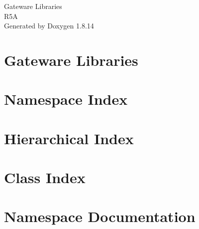 \documentclass[twoside]{book}
\newcommand{\+}{\discretionary{\mbox{\scriptsize$\hookleftarrow$}}{}{}}
\newcommand{\clearemptydoublepage}{%
  \newpage{\pagestyle{empty}\cleardoublepage}%
}
\begin{document}
\hypersetup{pageanchor=false,
             bookmarksnumbered=true,
             pdfencoding=unicode
            }
\begin{titlepage}
\vspace*{7cm}
\begin{center}%
{\Large Gateware Libraries \\[1ex]\large R5A }\\
\vspace*{1cm}
{\large Generated by Doxygen 1.8.14}\\
\end{center}
\end{titlepage}
\clearemptydoublepage
{}
\tableofcontents
\clearemptydoublepage
{}
\hypersetup{pageanchor=true}

\chapter{Gateware Libraries}
\label{index}\hypertarget{index}{}
\chapter{Namespace Index}

\chapter{Hierarchical Index}

\chapter{Class Index}

\chapter{Namespace Documentation}






\end{document}
